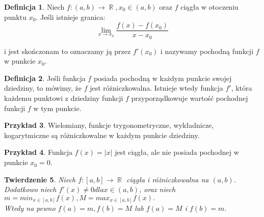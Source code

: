 \documentclass[12pt,a4paper]{article}
\newtheorem{tw}{Twierdzenie}[section]
\theoremstyle{definition}
\newtheorem{df}[tw]{Definicja}
\newtheorem{ex}[tw]{Przykład}
\DeclareMathOperator{\R}{\mathbb{R}}
\begin{document}
	\begin{df}
		Niech $f:(a,b) \rightarrow \R, x_0 \in (a,b)$ oraz $f$ ciągła w otoczeniu punktu $x_0$. Jeśli istnieje granica:\\
		\begin{displaymath}
			\lim_{x \to x_0} \frac{f(x)-f(x_0)}{x-x_0}
		\end{displaymath}

i jest skończonam to oznaczamy ją przez $f'(x_0)$ i nazywamy pochodną funkcji $f$ w punkcie $x_0$.
	\end{df}
	\begin{df}
		Jeśli funkcja $f$ posiada pochodną w każdym punkcie swojej dziedziny, to mówimy, że $f$ jest różniczkowalna. Istnieje wtedy funkcja $f'$, która każdemu punktowi z dziedziny funkcji $f$ przyporządkowuje wartość pochodnej funkcji $f$ w tym punkcie.
	\end{df}
	\begin{ex}
		Wielomiany, funkcje trygonometryczne, wykładnicze, kogarytmiczne są różniczkowalne w każdym punkcie dziedziny.
	\end{ex}
	\begin{ex}
		Funkcja $f(x)=|x|$ jest ciągła, ale nie posiada pochodnej w punkcie $x_0=0$.	
	\end{ex}
	\begin{tw}
		Niech $f: [a,b] \rightarrow \R$ ciągła i różniczkowalna na $(a,b)$. Dodatkowo niech $f'(x) \neq 0 dla x\in (a,b)$, oraz niech $m=min_{x\in [a,b]} f(x), M=max_{x \in [a,b]}f(x).$\\
Wtedy na pewno $f(a)=m, f(b)=M$ lub $f(a)=M$ i $f(b)=m$.
	\end{tw}
		
\end{document}
